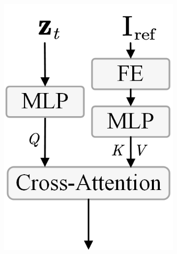 \begin{figure}[t!]
\begin{minipage}[b]{0.32\textwidth}
\begin{minipage}[b]{\textwidth}
\begin{subfigure}{0.22\linewidth}
                \includegraphics[width=0.95\linewidth]{figs/RefCondition/FE_CA.png} 
                \caption{}  
                \label{fig:RefConditionCA}  
            \end{subfigure}%
            \hfill
            \begin{subfigure}{0.22\linewidth} %
                \centering

\end{subfigure}
\end{minipage}
\end{minipage}
\end{figure}
